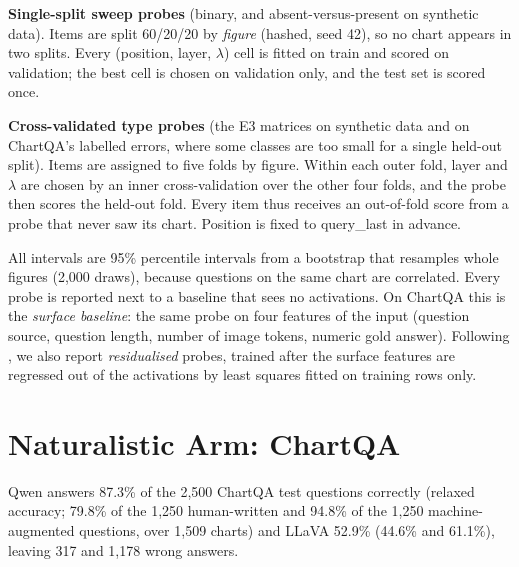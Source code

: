 \documentclass[11pt]{article}
\begin{document}
\textbf{Single-split sweep probes} (binary, and absent-versus-present on
synthetic data). Items are split 60/20/20 by
\emph{figure} (hashed, seed 42), so no chart appears in two splits. Every
(position, layer, $\lambda$) cell is fitted on train and scored on validation;
the best cell is chosen on validation only, and the test set is scored once.

\textbf{Cross-validated type probes} (the E3 matrices on synthetic data and on
ChartQA's labelled errors, where some classes are too small for a single
held-out split). Items are assigned to five
folds by figure. Within each outer fold, layer and $\lambda$ are chosen by an
inner cross-validation over the other four folds, and the probe then scores the
held-out fold. Every item thus receives an out-of-fold score from a probe that
never saw its chart. Position is fixed to query\_last in advance.

All intervals are 95\% percentile intervals from a bootstrap that resamples
whole figures (2,000 draws), because questions on the same chart are correlated.
Every probe is reported next to a baseline that sees no activations. On ChartQA
this is the \emph{surface baseline}: the same probe on four features of the
input (question source, question length, number of image tokens, numeric gold
answer). Following \citet{sahoo2026linearprobes}, we also report
\emph{residualised} probes, trained after the surface features are regressed out
of the activations by least squares fitted on training rows only.

\section{Naturalistic Arm: ChartQA}
\label{sec:chartqa}

Qwen answers 87.3\% of the 2,500 ChartQA test questions correctly (relaxed
accuracy; 79.8\% of the 1,250 human-written and 94.8\% of the 1,250
machine-augmented questions, over 1,509 charts) and LLaVA 52.9\% (44.6\% and
61.1\%), leaving 317 and 1,178 wrong answers.
\end{document}
